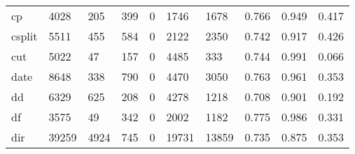 \begin{longtable}{lp{1.3cm}p{1.3cm}p{1.3cm}p{1.3cm}p{1.3cm}p{1.3cm}p{1.3cm}p{1.3cm}p{1.3cm}}
cp        &                   4028 &                                205 &                               399 &                                0 &                              1746 &                            1678 &                                   0.766 &                                  0.949 &                                0.417 \\
csplit    &                   5511 &                                455 &                               584 &                                0 &                              2122 &                            2350 &                                   0.742 &                                  0.917 &                                0.426 \\
cut       &                   5022 &                                 47 &                               157 &                                0 &                              4485 &                             333 &                                   0.744 &                                  0.991 &                                0.066 \\
date      &                   8648 &                                338 &                               790 &                                0 &                              4470 &                            3050 &                                   0.763 &                                  0.961 &                                0.353 \\
dd        &                   6329 &                                625 &                               208 &                                0 &                              4278 &                            1218 &                                   0.708 &                                  0.901 &                                0.192 \\
df        &                   3575 &                                 49 &                               342 &                                0 &                              2002 &                            1182 &                                   0.775 &                                  0.986 &                                0.331 \\
dir       &                  39259 &                               4924 &                               745 &                                0 &                             19731 &                           13859 &                                   0.735 &                                  0.875 &                                0.353 \\

\end{longtable}
